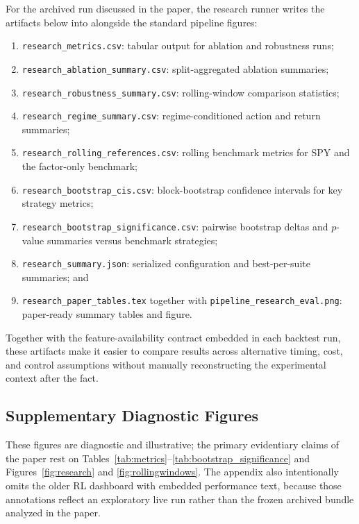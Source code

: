 \documentclass[11pt]{article}
\begin{document}
For the archived run discussed in the paper, the research runner writes the
artifacts below into
 alongside the standard
pipeline figures:
\begin{enumerate}[leftmargin=1.5em, itemsep=2pt, topsep=4pt]
\item \texttt{research\_metrics.csv}: tabular output for ablation and robustness runs;
\item \texttt{research\_ablation\_summary.csv}: split-aggregated ablation summaries;
\item \texttt{research\_robustness\_summary.csv}: rolling-window comparison statistics;
\item \texttt{research\_regime\_summary.csv}: regime-conditioned action and return summaries;
\item \texttt{research\_rolling\_references.csv}: rolling benchmark metrics for SPY and the factor-only benchmark;
\item \texttt{research\_bootstrap\_cis.csv}: block-bootstrap confidence intervals for key strategy metrics;
\item \texttt{research\_bootstrap\_significance.csv}: pairwise bootstrap deltas and $p$-value summaries versus benchmark strategies;
\item \texttt{research\_summary.json}: serialized configuration and best-per-suite summaries; and
\item \texttt{research\_paper\_tables.tex} together with
      \texttt{pipeline\_research\_eval.png}: paper-ready summary tables and
      figure.
\end{enumerate}

Together with the feature-availability contract embedded in each backtest run,
these artifacts make it easier to compare results across alternative timing,
cost, and control assumptions without manually reconstructing the experimental
context after the fact.

\subsection{Supplementary Diagnostic Figures}

These figures are diagnostic and illustrative; the primary evidentiary claims
of the paper rest on Tables~\ref{tab:metrics}--\ref{tab:bootstrap_significance}
and Figures~\ref{fig:research} and \ref{fig:rollingwindows}. The appendix also
intentionally omits the older RL dashboard with embedded performance text,
because those annotations reflect an exploratory live run rather than the frozen
archived bundle analyzed in the paper.
\end{document}
